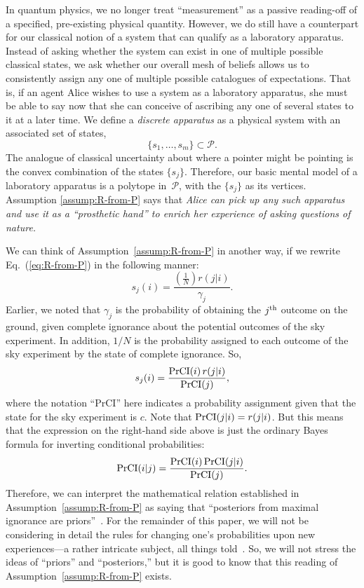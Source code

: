 \documentclass[aps,pra,superscriptaddress,10pt,tightenlines,twocolumn,nofootinbib]{revtex4}
\theoremstyle{remark}
\newcommand{\cP}{\mathcal{P}}
\begin{document}
In quantum physics, we no longer treat ``measurement'' as a passive
reading-off of a specified, pre-existing physical quantity.  However,
we do still have a counterpart for our classical notion of a system
that can qualify as a laboratory apparatus.  Instead of asking whether
the system can exist in one of multiple possible classical states, we
ask whether our overall mesh of beliefs allows us to consistently
assign any one of multiple possible catalogues of expectations.  That
is, if an agent Alice wishes to use a system as a laboratory
apparatus, she must be able to say now that she can conceive of
ascribing any one of several states to it at a later time.  We define
a \emph{discrete apparatus} as a physical system with an associated
set of states,
\begin{equation}
\{s_1,\ldots,s_{m}\} \subset \cP.
\end{equation}
The analogue of classical uncertainty about where a pointer might be
pointing is the convex combination of the states $\{s_j\}$.
Therefore, our basic mental model of a laboratory apparatus is a
polytope in~$\cP$, with the $\{s_j\}$ as its vertices.  Assumption
\ref{assump:R-from-P} says that \emph{Alice can pick up any such
  apparatus and use it as a ``prosthetic hand'' to enrich her
  experience of asking questions of nature.}

We can think of Assumption~\ref{assump:R-from-P} in another way, if we rewrite Eq.~(\ref{eq:R-from-P}) in the following manner:
\begin{equation}
s_j(i) = \frac{\left(\frac{1}{N}\right) r(j|i)}{\gamma_j}.
\end{equation}
Earlier, we noted that $\gamma_j$ is the probability of obtaining the $j^{\rm th}$ outcome on the ground, given complete ignorance about the potential outcomes of the sky experiment.  In addition, $1/N$ is the probability assigned to each outcome of the sky experiment by the state of complete ignorance.  So,
\begin{equation}
s_j(i) = \frac{\hbox{PrCI}(i)\, r(j|i)}{\hbox{PrCI}(j)},
\end{equation}
where the notation ``PrCI'' here indicates a probability assignment given that the state for the sky experiment is $c$.  Note that $\hbox{PrCI}(j|i) = r(j|i)$.  But this means that the expression on the right-hand side above is just the ordinary Bayes formula for inverting conditional probabilities:
\begin{equation}
\hbox{PrCI}(i|j) = \frac{\hbox{PrCI}(i)\, \hbox{PrCI}(j|i)}{\hbox{PrCI}(j)}.
\end{equation}
Therefore, we can interpret the mathematical relation established in Assumption~\ref{assump:R-from-P} as saying that ``posteriors from maximal ignorance are priors''~\cite{fuchs2013}.  For the remainder of this paper, we will not be considering in detail the rules for changing one's probabilities upon new experiences---a rather intricate subject, all things told~\cite{QBist-decoherence, stacey-thesis}.  So, we will not stress the ideas of ``priors'' and ``posteriors,'' but it is good to know that this reading of Assumption~\ref{assump:R-from-P} exists.
\end{document}
